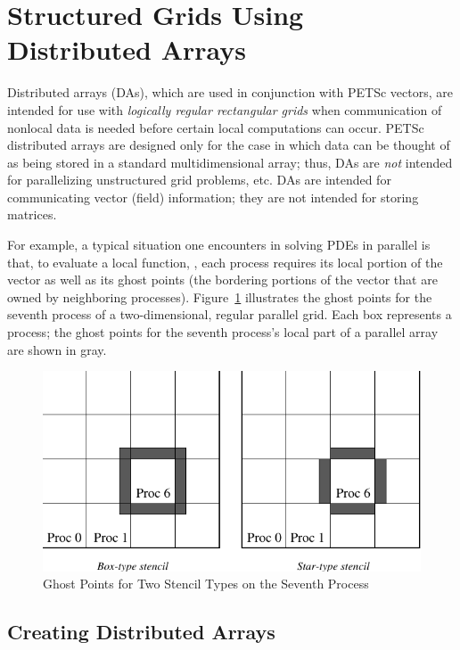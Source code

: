 \section{Structured Grids Using Distributed Arrays}
\label{sec_da} \label{sec_struct}

  Distributed arrays (DAs), which are used in
conjunction with PETSc vectors, are intended for use with {\em
logically regular rectangular grids} when communication of nonlocal data is
needed before certain local computations can occur.  PETSc distributed
arrays are designed only for the case in which data can be thought of
as being stored in a standard multidimensional array; thus, DAs 
are {\em not} intended for parallelizing unstructured grid problems, etc.
DAs are intended for communicating vector (field) information; they 
are not intended for storing matrices. 

For example, a typical situation one encounters in solving 
PDEs in parallel is that, to evaluate a local function, , each process
requires its local portion of the vector  as well as its ghost
points  (the bordering portions of the vector
that are owned by neighboring processes).  Figure~\ref{fig_ghosts}
illustrates the ghost points for the seventh process of a
two-dimensional, regular parallel grid.  Each box represents a
process; the ghost points for the seventh process's local part of
a parallel array are shown in gray.

\begin{figure}[tb]
\centerline{ \includegraphics{ghost}}
\caption{Ghost Points for Two Stencil Types on the Seventh Process}
\label{fig_ghosts}
\end{figure}

\subsection{Creating Distributed Arrays}

